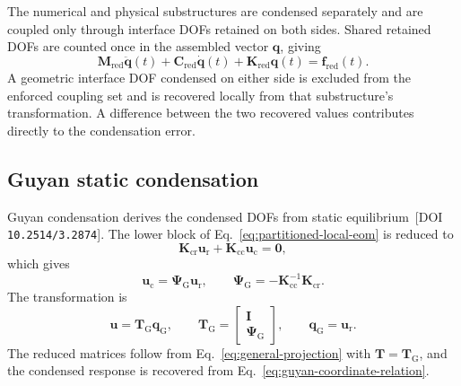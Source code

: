 \documentclass[11pt]{article}
\newcommand{\rev}[1]{{\color{red}#1}}
\newenvironment{revision}{\begingroup\color{red}}{\endgroup}
\begin{document}
\begin{revision}
The numerical and physical substructures are condensed separately and are coupled only through interface DOFs retained on both sides. Shared retained DOFs are counted once in the assembled vector \(\bm{q}\), giving
\end{revision}
\begin{equation}
    \mathbf{M}_{\mathrm{red}}\ddot{\bm{q}}(t)
    +\mathbf{C}_{\mathrm{red}}\dot{\bm{q}}(t)
    +\mathbf{K}_{\mathrm{red}}\bm{q}(t)
    =\bm{f}_{\mathrm{red}}(t).
    \label{eq:assembled-reduced-eom}
\end{equation}
\begin{revision}
A geometric interface DOF condensed on either side is excluded from the enforced coupling set and is recovered locally from that substructure's transformation. A difference between the two recovered values contributes directly to the condensation error.
\end{revision}

\subsection{Guyan static condensation}\label{sec:guyan}

Guyan condensation derives the condensed DOFs from static equilibrium \cite{Guyan1965}\,\rev{[DOI \nolinkurl{10.2514/3.2874}]}. The lower block of Eq.~\eqref{eq:partitioned-local-eom} is reduced to
\begin{equation}
    \mathbf{K}_{\mathrm{cr}}\bm{u}_{\mathrm{r}}
    +\mathbf{K}_{\mathrm{cc}}\bm{u}_{\mathrm{c}}=\bm{0},
    \label{eq:guyan-static-equilibrium}
\end{equation}
which gives
\begin{equation}
    \bm{u}_{\mathrm{c}}=\bm{\Psi}_{\mathrm{G}}\bm{u}_{\mathrm{r}},
    \qquad
    \bm{\Psi}_{\mathrm{G}}=-\mathbf{K}_{\mathrm{cc}}^{-1}\mathbf{K}_{\mathrm{cr}}.
    \label{eq:guyan-coordinate-relation}
\end{equation}
The transformation is
\begin{equation}
    \bm{u}=\mathbf{T}_{\mathrm{G}}\bm{q}_{\mathrm{G}},
    \qquad
    \mathbf{T}_{\mathrm{G}}=
    \begin{bmatrix}
    \mathbf{I}\\
    \bm{\Psi}_{\mathrm{G}}
    \end{bmatrix},
    \qquad
    \bm{q}_{\mathrm{G}}=\bm{u}_{\mathrm{r}}.
    \label{eq:guyan-transformation}
\end{equation}
The reduced matrices follow from Eq.~\eqref{eq:general-projection} with \(\mathbf{T}=\mathbf{T}_{\mathrm{G}}\), and the condensed response is recovered from Eq.~\eqref{eq:guyan-coordinate-relation}.
\end{document}
